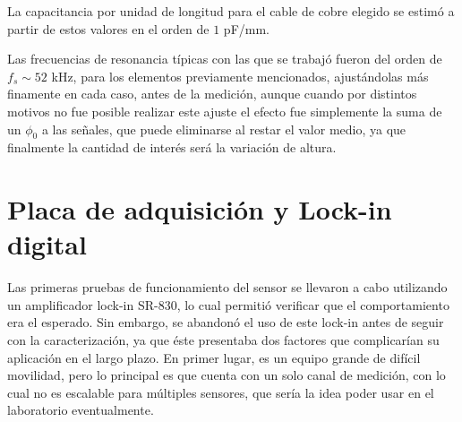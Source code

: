 La capacitancia por unidad de longitud para el cable de cobre elegido se estimó a partir de estos valores en el orden de $1$ pF/mm. %


Las frecuencias de resonancia típicas con las que se trabajó fueron del orden de $f_s\sim52$ kHz, para los elementos previamente mencionados, ajustándolas más finamente en cada caso, antes de la medición, aunque cuando por distintos motivos no fue posible realizar este ajuste el efecto fue simplemente la suma de un $\phi_0$ a las señales, que puede eliminarse al restar el valor medio, ya que finalmente la cantidad de interés será la variación de altura. %




%



\section{Placa de adquisición y Lock-in digital} 
\label{sec:lock-in_digital}  
Las primeras pruebas de funcionamiento del sensor se llevaron a cabo utilizando un amplificador lock-in SR-830, lo cual permitió verificar que el comportamiento era el esperado. Sin embargo, se abandonó el uso de este lock-in antes de seguir con la caracterización, ya que éste presentaba dos factores que complicarían su aplicación en el largo plazo. En primer lugar, es un equipo grande de difícil movilidad, pero lo principal es que cuenta con un solo canal de medición, con lo cual no es escalable para múltiples sensores, que sería la idea poder usar en el laboratorio eventualmente. 

